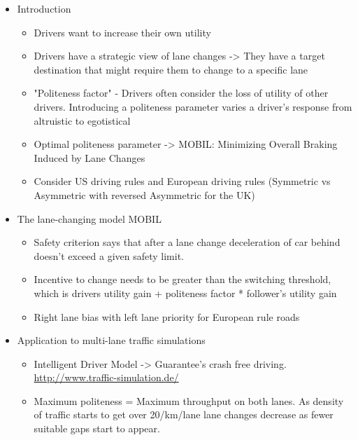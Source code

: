 \begin{itemize}
\item Introduction
\begin{itemize}
\item Drivers want to increase their own utility
\item Drivers have a strategic view of lane changes -> They have a target destination that might require them to change to a specific lane
\item "Politeness factor" - Drivers often consider the loss of utility of other drivers. Introducing a politeness parameter varies a driver's response from altruistic to egotistical
\item Optimal politeness parameter -> MOBIL: Minimizing Overall Braking Induced by Lane Changes
\item Consider US driving rules and European driving rules (Symmetric vs Asymmetric with reversed Asymmetric for the UK)
\end{itemize}
\item The lane-changing model MOBIL
\begin{itemize}
\item Safety criterion says that after a lane change deceleration of car behind doesn't exceed a given safety limit.
\item Incentive to change needs to be greater than the switching threshold, which is drivers utility gain + politeness factor * follower's utility gain
\item Right lane bias with left lane priority for European rule roads
\end{itemize}
\item Application to multi-lane traffic simulations
\begin{itemize}
\item Intelligent Driver Model -> Guarantee's crash free driving. \url{http://www.traffic-simulation.de/}
\item Maximum politeness = Maximum throughput on both lanes. As density of traffic starts to get over 20/km/lane lane changes decrease as fewer suitable gaps start to appear.
\end{itemize}
\end{itemize}


